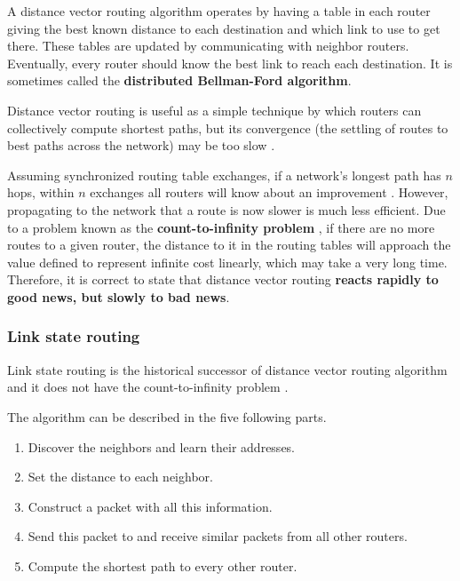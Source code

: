 A distance vector routing algorithm operates by having a table in each router giving the best known distance to each destination and which link to use to get there.
These tables are updated by communicating with neighbor routers.
Eventually, every router should know the best link to reach each destination.
It is sometimes called the \textbf{distributed Bellman-Ford algorithm}.

Distance vector routing is useful as a simple technique by which routers can collectively compute shortest paths, but its convergence (the settling of routes to best paths across the network) may be too slow \cite[p.~372]{computer-networks-tanenbaum-2012}.

Assuming synchronized routing table exchanges, if a network's longest path has \(n\) hops, within \(n\) exchanges all routers will know about an improvement \cite[p.~372]{computer-networks-tanenbaum-2012}. However, propagating to the network that a route is now slower is much less efficient. Due to a problem known as the \textbf{count-to-infinity problem} \cite[p.~373]{computer-networks-tanenbaum-2012}, if there are no more routes to a given router, the distance to it in the routing tables will approach the value defined to represent infinite cost linearly, which may take a very long time. Therefore, it is correct to state that distance vector routing \textbf{reacts rapidly to good news, but slowly to bad news}.

\subsubsection{Link state routing}\label{Link state routing}

Link state routing is the historical successor of distance vector routing algorithm and it does not have the count-to-infinity problem \cite[p.~373]{computer-networks-tanenbaum-2012}.

The algorithm can be described in the five following parts.

\begin{enumerate}
    \item Discover the neighbors and learn their addresses.
    \item Set the distance to each neighbor.
    \item Construct a packet with all this information.
    \item Send this packet to and receive similar packets from all other routers.
    \item Compute the shortest path to every other router.
\end{enumerate}

